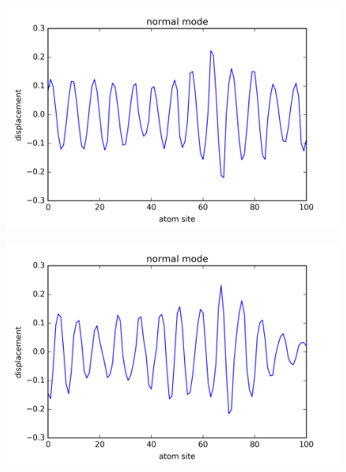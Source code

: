 \begin{figure}[!htbh]
\centering
\begin{minipage}{.45\textwidth}
  \centering
  \includegraphics[width=1.1\linewidth]{Harmonic_spring_ratio/prob_spr_N_103sp_2_0p_0_126th.png}
  \label{fig:prob_spring_N_103m_2p_0_1_26th}
\end{minipage}\qquad
\begin{minipage}{.45\textwidth}
  \centering
  \includegraphics[width=1.1\linewidth]{Harmonic_spring_ratio/prob_spr_N_103sp_2_0p_0_526th.png}
  \label{fig:prob_spring_N_103m_2p_0_5_26th}
\end{minipage}
\end{figure}

